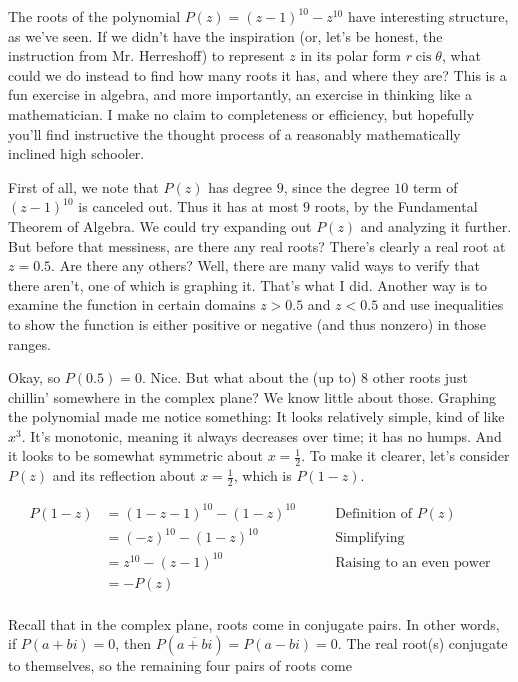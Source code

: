 \documentclass{article}
\begin{document}
\iffalse
\begin{asy}
import graph;

size(400, 200, IgnoreAspect);

real P(real x) {
    return pow(x - 1, 10) - pow(x, 10);
}

draw(graph(P,0,1),red,"$P(z)$");

xaxis("$x$",Ticks);
yaxis("$y$",Ticks;

\end{asy}
\fi

The roots of the polynomial $P(z)=(z-1)^10-z^10$ have interesting structure, as we've seen. If we didn't have the inspiration (or, let's be honest, the instruction from Mr. Herreshoff) to represent $z$ in its polar form $r\operatorname{cis}\theta$, what could we do instead to find how many roots it has, and where they are? This is a fun exercise in algebra, and more importantly, an exercise in thinking like a mathematician. I make no claim to completeness or efficiency, but hopefully you'll find
instructive the thought process of a reasonably mathematically inclined high schooler.

First of all, we note that $P(z)$ has degree $9$, since the degree $10$ term of $(z-1)^10$ is canceled out. Thus it has at most $9$ roots, by the Fundamental Theorem of Algebra. We could try expanding out $P(z)$ and analyzing it further. But before that messiness, are there any real roots? There's clearly a real root at $z=0.5$. Are there any others? Well, there are many valid ways to verify that there aren't, one of which is graphing it. That's what I did. Another way is to examine the function in certain
domains $z>0.5$ and $z<0.5$ and use inequalities to show the function is either positive or negative (and thus nonzero) in those ranges.

Okay, so $P(0.5)=0$. Nice. But what about the (up to) $8$ other roots just chillin' somewhere in the complex plane? We know little about those. Graphing the polynomial made me notice something: It looks relatively simple, kind of like $x^3$. It's monotonic, meaning it always decreases over time; it has no humps. And it looks to be somewhat symmetric about $x=\frac{1}{2}$. To make it clearer, let's consider $P(z)$ and its reflection about $x=\frac{1}{2}$, which is $P(1-z)$.

\begin{align}
P(1-z) &= (1-z-1)^10 - (1-z)^10 \qquad & \text{Definition of $P(z)$} \\
&= (-z)^10 - (1-z)^10 & \text{Simplifying} \\
&= z^10 - (z-1)^10 & \text{Raising to an even power} \\
&= -P(z) \\
\end{align}

Recall that in the complex plane, roots come in conjugate pairs. In other words, if $P(a+bi)=0$, then $P(\overline{a+bi})=P(a-bi)=0$. The real root(s) conjugate to themselves, so the remaining four pairs of roots come 
\end{document}
